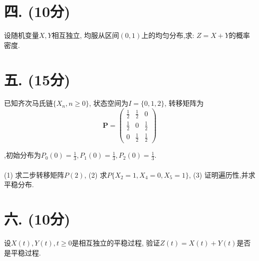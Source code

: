 \documentclass[a4paper,11pt]{article}
\begin{document}
\begin{CJK}{UTF8}{song}
\section*{四. (10分)}

设随机变量$X,Y$相互独立, 均服从区间$(0,1)$上的均匀分布,求: $Z=X+Y$的概率密度.

\section*{五. (15分)}

已知齐次马氏链$\{X_n,n\ge 0\}$, 状态空间为$I=\{0,1,2\}$, 转移矩阵为
\renewcommand\arraystretch{1.8}
\[
\mathbf{P}=
\begin{pmatrix}
            \displaystyle{ \frac{1}{2} } & \displaystyle{ \frac{1}{2} } & 0\\
            \displaystyle{ \frac{1}{2} } & 0 & \displaystyle{ \frac{1}{2} }\\
            0 & \displaystyle{ \frac{1}{2} } & \displaystyle{ \frac{1}{2} }
\end{pmatrix}
\]

,初始分布为$\displaystyle{ P_0(0)=\frac{1}{3}, P_1(0)=\frac{1}{3}, P_2(0)=\frac{1}{3} }$. \\
\\
(1) 求二步转移矩阵$P(2)$, (2) 求$P\{X_2=1,X_4=0,X_5=1\}$, (3) 证明遍历性,并求平稳分布.

\section*{六. (10分)}

设$X(t),Y(t),t\ge 0$是相互独立的平稳过程, 验证$Z(t)=X(t)+Y(t)$是否是平稳过程.

\end{CJK}
\end{document}
